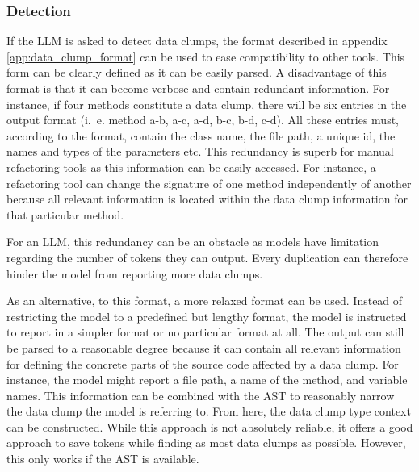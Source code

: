 \subsubsection{Detection}
If the \ac{LLM} is asked to detect data clumps, the format described in appendix \ref{app:data_clump_format} can be used to ease compatibility to other tools. This form can be clearly defined as it can be easily parsed. A disadvantage of this format is that it can become verbose and contain redundant information. For instance, if four methods  constitute a data clump, there will be six entries in the output format (i.~e. method a-b, a-c, a-d, b-c, b-d, c-d). All these entries must, according to the format, contain the class name, the file path, a unique id, the names and types of the parameters etc. This redundancy is superb for manual refactoring tools as this information can be easily accessed. For instance, a refactoring tool can change the signature of one method independently of another because all relevant information is located within the data clump information for that particular method. 

For an \ac{LLM}, this redundancy can be an obstacle as models have limitation regarding the number of tokens they can output. Every duplication can therefore hinder the model from reporting more data clumps.



As an alternative, to this format, a more relaxed format can be used. Instead of restricting the model to a predefined but lengthy format, the model is instructed to report in a simpler format or no particular format at all. The output can still be parsed to a reasonable degree because it can contain all relevant information for defining the concrete parts of the source code affected by a data clump. For instance, the model might report a file path, a name of the method, and variable names. This information can be combined with the \ac{AST} to reasonably narrow the data clump the model is referring to. From here, the data clump type context can be constructed. While this approach is not absolutely reliable, it offers a good approach to save tokens while finding as most data clumps as possible. However, this only works if the \ac{AST} is available. 

